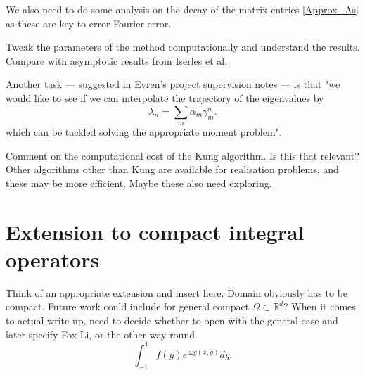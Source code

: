 \documentclass[11pt, a4paper]{article}
\newcommand{\im}{\text{i}}
\numberwithin{equation}{section}
\begin{document}
We also need to do some analysis on the decay of the matrix entries \eqref{Approx_As} as these are key to error Fourier error.

Tweak the parameters of the method computationally and understand the results. Compare with asymptotic results from Iserles et al.

Another task --- suggested in Evren's project supervision notes --- is that "we would like to see if we can interpolate the trajectory of the eigenvalues by
\[
\overline{\lambda}_n = \sum_m\alpha_m\gamma_m^n.
\]
which can be tackled solving the appropriate moment problem".

Comment on the computational cost of the Kung algorithm. Is this that relevant? Other algorithms other than Kung are available for realisation problems, and these may be more efficient. Maybe these also need exploring.


\section{Extension to compact integral operators}
Think of an appropriate extension and insert here. Domain obviously has to be compact. Future work could include for general compact $\Omega\subset\mathbb{R}^d$? When it comes to actual write up, need to decide whether to open with the general case and later specify Fox-Li, or the other way round.
\[
\int_{-1}^1 f(y)e^{\im \omega g(x, y)}dy.
\]
\end{document}
